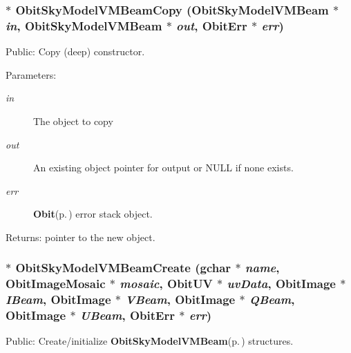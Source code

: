 \subsubsection{$\ast$ Obit\-Sky\-Model\-VMBeam\-Copy ({\bf Obit\-Sky\-Model\-VMBeam} $\ast$ {\em in}, {\bf Obit\-Sky\-Model\-VMBeam} $\ast$ {\em out}, {\bf Obit\-Err} $\ast$ {\em err})}\label{ObitSkyModelVMBeam_8c_a14}


Public: Copy (deep) constructor. 

\begin{Desc}
\item[Parameters:]
\begin{description}
\item[{\em in}]The object to copy \item[{\em out}]An existing object pointer for output or NULL if none exists. \item[{\em err}]{\bf Obit}{\rm (p.\,\pageref{structObit})} error stack object. \end{description}
\end{Desc}
\begin{Desc}
\item[Returns:]pointer to the new object. \end{Desc}
\subsubsection{$\ast$ Obit\-Sky\-Model\-VMBeam\-Create (gchar $\ast$ {\em name}, {\bf Obit\-Image\-Mosaic} $\ast$ {\em mosaic}, {\bf Obit\-UV} $\ast$ {\em uv\-Data}, {\bf Obit\-Image} $\ast$ {\em IBeam}, {\bf Obit\-Image} $\ast$ {\em VBeam}, {\bf Obit\-Image} $\ast$ {\em QBeam}, {\bf Obit\-Image} $\ast$ {\em UBeam}, {\bf Obit\-Err} $\ast$ {\em err})}\label{ObitSkyModelVMBeam_8c_a15}


Public: Create/initialize {\bf Obit\-Sky\-Model\-VMBeam}{\rm (p.\,\pageref{structObitSkyModelVMBeam})} structures. 

